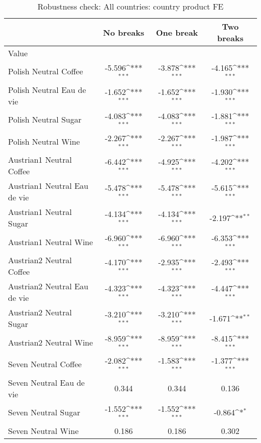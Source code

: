 \begin{table}[htbp]\centering
\def\sym#1{\ifmmode^{#1}\else\(^{#1}\)\fi}
\caption{Robustness check: All countries: country product FE\label{tab1}}
\begin{tabular}{l*{3}{c}}
\hline\hline
                    &\multicolumn{1}{c}{No breaks}&\multicolumn{1}{c}{One break}&\multicolumn{1}{c}{Two breaks}\\
\hline
Value               &                     &                     &                     \\
Polish Neutral Coffee&      -5.596\sym{***}&      -3.878\sym{***}&      -4.165\sym{***}\\
Polish Neutral Eau de vie&      -1.652\sym{***}&      -1.652\sym{***}&      -1.930\sym{***}\\
Polish Neutral Sugar&      -4.083\sym{***}&      -4.083\sym{***}&      -1.881\sym{***}\\
Polish Neutral Wine &      -2.267\sym{***}&      -2.267\sym{***}&      -1.987\sym{***}\\
Austrian1 Neutral Coffee&      -6.442\sym{***}&      -4.925\sym{***}&      -4.202\sym{***}\\
Austrian1 Neutral Eau de vie&      -5.478\sym{***}&      -5.478\sym{***}&      -5.615\sym{***}\\
Austrian1 Neutral Sugar&      -4.134\sym{***}&      -4.134\sym{***}&      -2.197\sym{**} \\
Austrian1 Neutral Wine&      -6.960\sym{***}&      -6.960\sym{***}&      -6.353\sym{***}\\
Austrian2 Neutral Coffee&      -4.170\sym{***}&      -2.935\sym{***}&      -2.493\sym{***}\\
Austrian2 Neutral Eau de vie&      -4.323\sym{***}&      -4.323\sym{***}&      -4.447\sym{***}\\
Austrian2 Neutral Sugar&      -3.210\sym{***}&      -3.210\sym{***}&      -1.671\sym{**} \\
Austrian2 Neutral Wine&      -8.959\sym{***}&      -8.959\sym{***}&      -8.415\sym{***}\\
Seven Neutral Coffee&      -2.082\sym{***}&      -1.583\sym{***}&      -1.377\sym{***}\\
Seven Neutral Eau de vie&       0.344         &       0.344         &       0.136         \\
Seven Neutral Sugar &      -1.552\sym{***}&      -1.552\sym{***}&      -0.864\sym{*}  \\
Seven Neutral Wine  &       0.186         &       0.186         &       0.302         \\

\end{tabular}
\end{table}

